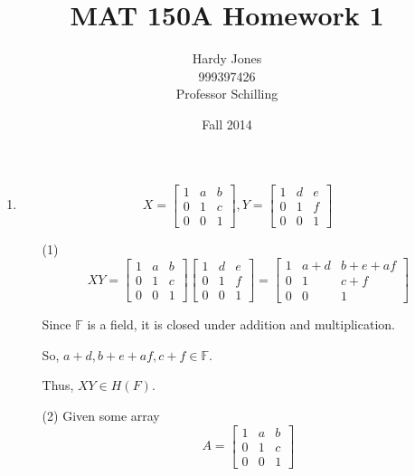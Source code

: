 \documentclass[12pt,letterpaper]{article}
\title{MAT 150A Homework 1\vspace{-2ex}}
\author{Hardy Jones\\
        999397426\\
        Professor Schilling\vspace{-2ex}}
\date{Fall 2014}
\begin{document}
  \maketitle

  \begin{enumerate}
    \item
      \[X =
        \begin{bmatrix}
          1 & a & b \\
          0 & 1 & c \\
          0 & 0 & 1
        \end{bmatrix}
        ,
        Y =
        \begin{bmatrix}
          1 & d & e \\
          0 & 1 & f \\
          0 & 0 & 1
        \end{bmatrix}
      \]
      \begin{enumerate}
        \item[(1)]
          \[XY =
            \begin{bmatrix}
              1 & a & b \\
              0 & 1 & c \\
              0 & 0 & 1
            \end{bmatrix}
            \begin{bmatrix}
              1 & d & e \\
              0 & 1 & f \\
              0 & 0 & 1
            \end{bmatrix}
            =
            \begin{bmatrix}
              1 & a + d & b + e + af \\
              0 & 1     & c + f \\
              0 & 0     & 1
            \end{bmatrix}
          \]

          Since $\mathbb{F}$ is a field, it is closed under addition and multiplication.

          So, $a+d, b+e+af, c+f \in \mathbb{F}$.

          Thus, $XY \in H(F)$.

        \item[(2)]
          Given some array
          \[A =
            \begin{bmatrix}
              1 & a & b \\
              0 & 1 & c \\
              0 & 0 & 1
            \end{bmatrix}
          \]


\end{enumerate}
\end{enumerate}
\end{document}
